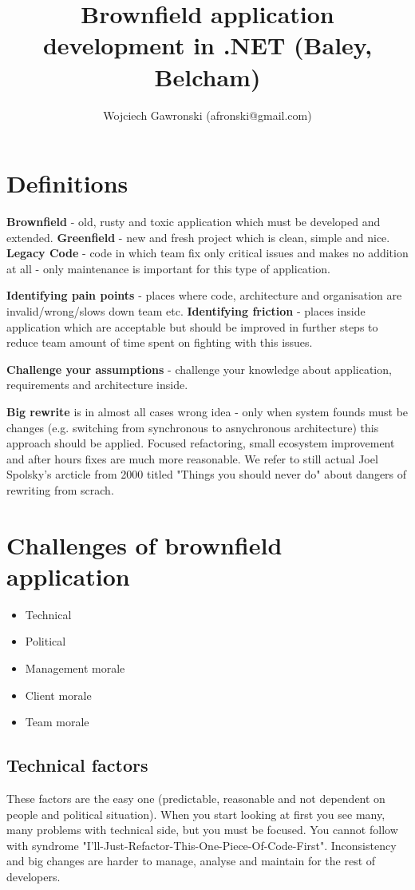 \documentclass[11pt,a4paper]{article}
\title{Brownfield application development in .NET (Baley, Belcham)}
\author{Wojciech Gawronski (afronski@gmail.com)}
\begin{document}
\lstset{language=JavaScript}

\maketitle
\newpage

\tableofcontents
\newpage

\section{Definitions}

\textbf{Brownfield} - old, rusty and toxic application which must be developed and extended.
\textbf{Greenfield} - new and fresh project which is clean, simple and nice.
\textbf{Legacy Code} - code in which team fix only critical issues and makes no addition at all - only maintenance is important for this type of application.

\textbf{Identifying pain points} - places where code, architecture and organisation are invalid/wrong/slows down team etc.
\textbf{Identifying friction} - places inside application which are acceptable but should be improved in further steps to reduce team amount of time spent on fighting with this issues.

\textbf{Challenge your assumptions} - challenge your knowledge about application, requirements and architecture inside.

\textbf{Big rewrite} is in almost all cases wrong idea - only when system founds must be changes (e.g. switching from synchronous to asnychronous architecture) this approach should be applied. Focused refactoring, small ecosystem improvement and after hours fixes are much more reasonable. We refer to still actual Joel Spolsky's arcticle from 2000 titled "Things you should never do" about dangers of rewriting from scrach.

\section{Challenges of brownfield application}
\begin{itemize}
    \item Technical
    \item Political
    \item Management morale
    \item Client morale
    \item Team morale
\end{itemize}

\subsection{Technical factors}
These factors are the easy one (predictable, reasonable and not dependent on people and political situation). When you start looking at first you see many, many problems with technical side, but you must be focused. You cannot follow with syndrome "I'll-Just-Refactor-This-One-Piece-Of-Code-First". Inconsistency and big changes are harder to manage, analyse and maintain for the rest of developers.
\end{document}
